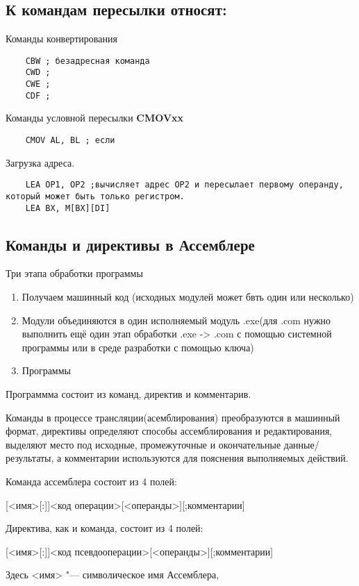 \subsection{К командам пересылки относят:}
Команды конвертирования
\begin{verbatim}
    CBW ; безадресная команда
    CWD ;
    CWE ;
    CDF ;
\end{verbatim}

Команды условной пересылки \textbf{CMOVxx}
\begin{verbatim}
    CMOV AL, BL ; если
\end{verbatim}
Загрузка адреса.
\begin{verbatim}
    LEA OP1, OP2 ;вычисляет адрес OP2 и пересылает первому операнду, который может быть только регистром.
    LEA BX, M[BX][DI]
\end{verbatim}

\subsection{Команды и директивы в Ассемблере}
Три этапа обработки программы 
\begin{enumerate}
    \item Получаем машинный код (исходных модулей может бвть один или несколько)
    \item Модули объединяются в один исполняемый модуль .exe(для .com нужно выполнить ещё один этап обработки .exe -> .com с помощью системной программы или в среде разработки с помощью ключа)
    \item Программы
\end{enumerate}
Программма состоит из команд, директив и комментарив.

Команды в процессе трансляции(асемблирования) преобразуются в машинный формат, директивы определяют способы ассемблирования и редактирования, выделяют место под исходные, промежуточные и окончательные данные/результаты, а комментарии используются для пояснения выполняемых действий.

Команда ассемблера состоит из 4 полей:

\begin{center}
    [<имя>[:]]<код операции>[<операнды>][;комментарии]
\end{center}

Директива, как и команда, состоит из 4 полей:

\begin{center}
    [<имя>[:]]<код псевдооперации>[<операнды>][;комментарии]
\end{center}
Здесь <имя> "--- символическое имя Ассемблера,

